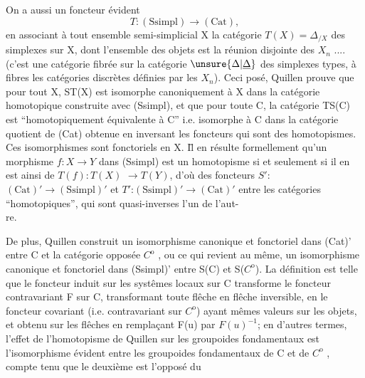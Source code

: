 On a aussi un foncteur évident
\[ T: (\mathrm{Ssimpl}) \longrightarrow (\mathrm{Cat}) , \]
en associant à tout ensemble semi-simplicial X la catégorie $T(X) = \Delta_{/X}$
des simplexes sur X, dont l'ensemble des objets est la réunion disjointe
des $X_n$ .... (c'est une catégorie fibrée sur la catégorie $\unsure{\Delta|\underline{\Delta}}$ des simplexes
types, à fibres les catégories discrètes définies par les $X_n$). Ceci posé,
Quillen prouve que pour tout X, ST(X) est isomorphe canoniquement à X dans
la catégorie homotopique construite avec (Ssimpl), et que pour toute C,
la catégorie TS(C) est  ``homotopiquement équivalente à C''  i.e.
 isomorphe à C dans la catégorie quotient de (Cat) obtenue en inversant les
foncteurs qui sont des homotopismes.  Ces isomorphismes sont
fonctoriels en X. I\={l} en résulte formellement qu'un morphisme $f:X\to Y$ dans
(Ssimpl) est un homotopisme si et seulement si il en est ainsi de $T(f):T(X)$
$\to T(Y)$, d'où des foncteurs $S'$: $(\mathrm{Cat})' \longrightarrow (\mathrm{Ssimpl})'$ et $T'$:$(\mathrm{Ssimpl})'\longrightarrow(\mathrm{Cat})'$
entre les catégories ``homotopiques'',  qui sont quasi-inverses l'un de l'aut-\\
re.

De plus, Quillen construit un isomorphisme canonique et fonctoriel
dans (Cat)' entre C et la catégorie opposée $C^{\mathrm{o}}$ , ou ce qui revient au
même, un isomorphisme canonique et fonctoriel dans (Ssimpl)' entre S(C) et
S($C^{\mathrm{o}}$).  La définition est telle que le
foncteur induit sur les systêmes locaux sur C transforme le foncteur
contravariant F sur C, transformant toute flêche en flêche inversible, en
le foncteur covariant (i.e. contravariant sur $C^{\mathrm{o}}$) ayant mêmes valeurs sur
les objets, et obtenu sur les flêches en remplaçant F(u) par $F(u)^{-1}$; en
d'autres termes, l'effet de l'homotopisme de Quillen sur les groupoides
fondamentaux est l'isomorphisme évident entre les groupoides fondamentaux
de C et de $C^{\mathrm{o}}$ , compte tenu que le deuxième est l'opposé du

